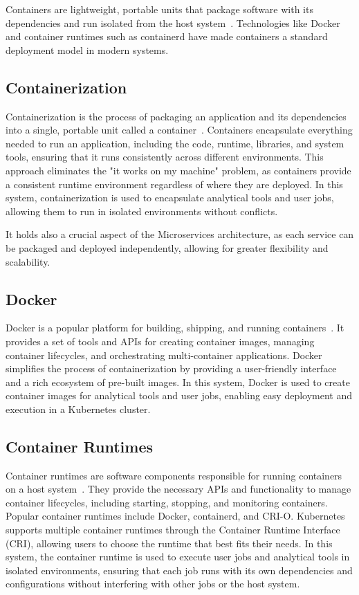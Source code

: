 Containers are lightweight, portable units that package software with its dependencies and run isolated from the host 
system~\cite{docker-docs}. Technologies like Docker and container runtimes such as containerd have made containers a 
standard deployment model in modern systems. 

\subsection{Containerization}
Containerization is the process of packaging an application and its dependencies into a single, portable unit called a container~\cite{merkel-containers}.
Containers encapsulate everything needed to run an application, including the code, runtime, libraries, and system tools, ensuring that it runs consistently across different environments.
This approach eliminates the "it works on my machine" problem, as containers provide a consistent runtime environment regardless of where they are deployed.
In this system, containerization is used to encapsulate analytical tools and user jobs, allowing them to run in isolated environments without conflicts.

It holds also a crucial aspect of the Microservices architecture, as each service can be packaged and deployed independently, allowing for greater flexibility and scalability.

\subsection{Docker}
Docker is a popular platform for building, shipping, and running containers~\cite{docker-docs}. It provides a set of tools and APIs for creating container images, managing container lifecycles, and orchestrating multi-container applications. Docker simplifies the process of containerization by providing a user-friendly interface and a rich ecosystem of pre-built images.
In this system, Docker is used to create container images for analytical tools and user jobs, enabling easy deployment and execution in a Kubernetes cluster.
\subsection{Container Runtimes}
Container runtimes are software components responsible for running containers on a host system~\cite{containerd-docs}. They provide the necessary APIs and functionality to manage container lifecycles, including starting, stopping, and monitoring containers.
Popular container runtimes include Docker, containerd, and CRI-O. Kubernetes supports multiple container runtimes through the Container Runtime Interface (CRI), allowing users to choose the runtime that best fits their needs.
In this system, the container runtime is used to execute user jobs and analytical tools in isolated environments, ensuring that each job runs with its own dependencies and configurations without interfering with other jobs or the host system. 

